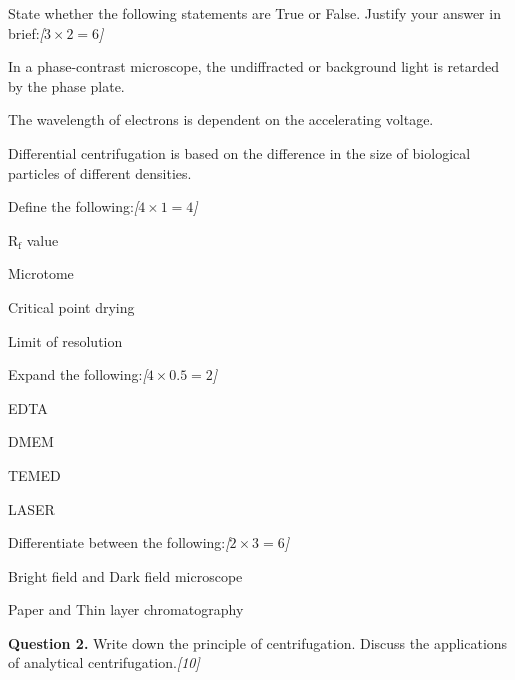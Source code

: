 \documentclass[11pt,a4paper]{article}
\newcommand{\pts}[1]{\hfill   \textit{[#1]}}
\begin{document}
\begin{parts}
  \item State whether the following statements are True or False. Justify your answer in brief:\pts{$3  \times 2 = 6$}
  
\begin{parts}
    \item In a phase-contrast microscope, the undiffracted or background light is retarded by the phase plate.
    \item The wavelength of electrons is dependent on the accelerating voltage.
    \item Differential centrifugation is based on the difference in the size of biological particles of different densities.
  \end{parts}

  \item Define the following:\pts{$4  \times 1 = 4$}
  
\begin{parts}
    \item $ \text{R}_{ \text{f}}$ value
    \item Microtome
    \item Critical point drying
    \item Limit of resolution
  \end{parts}

  \item Expand the following:\pts{$4  \times 0.5 = 2$}
  
\begin{parts}
    \item EDTA
    \item DMEM
    \item TEMED
    \item LASER
  \end{parts}

  \item Differentiate between the following:\pts{$2  \times 3 = 6$}
  
\begin{parts}
    \item Bright field and Dark field microscope
    \item Paper and Thin layer chromatography
  \end{parts}
\end{parts}

\medskip


\noindent   \textbf{Question 2.} Write down the principle of centrifugation. Discuss the applications of analytical centrifugation.\pts{10}
\end{document}
